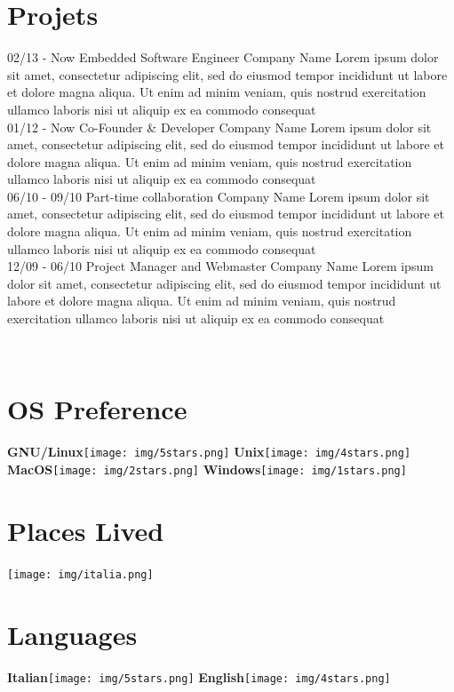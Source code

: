 \documentclass[]{friggeri-cv}
\begin{document}
\section{Projets}
\begin{entrylist}
  \entry
    {02/13 - Now}
    {Embedded Software Engineer}
    {Company Name}
    {Lorem ipsum dolor sit amet, consectetur adipiscing elit, sed do eiusmod tempor incididunt ut labore et dolore magna aliqua. Ut enim ad minim veniam, quis nostrud exercitation ullamco laboris nisi ut aliquip ex ea commodo consequat\\}
  \entry
    {01/12 - Now}
    {Co-Founder \& Developer}
    {Company Name}
    {Lorem ipsum dolor sit amet, consectetur adipiscing elit, sed do eiusmod tempor incididunt ut labore et dolore magna aliqua. Ut enim ad minim veniam, quis nostrud exercitation ullamco laboris nisi ut aliquip ex ea commodo consequat\\}
  \entry
    {06/10 - 09/10}
    {Part-time collaboration}
    {Company Name}
    {Lorem ipsum dolor sit amet, consectetur adipiscing elit, sed do eiusmod tempor incididunt ut labore et dolore magna aliqua. Ut enim ad minim veniam, quis nostrud exercitation ullamco laboris nisi ut aliquip ex ea commodo consequat\\}
  \entry
    {12/09 - 06/10}
    {Project Manager and Webmaster}
    {Company Name}
    {Lorem ipsum dolor sit amet, consectetur adipiscing elit, sed do eiusmod tempor incididunt ut labore et dolore magna aliqua. Ut enim ad minim veniam, quis nostrud exercitation ullamco laboris nisi ut aliquip ex ea commodo consequat\\}
\end{entrylist}
\newpage

\begin{aside}
~
~
~
  \section{OS Preference}
    \textbf{GNU/Linux}\texttt{[image: img/5stars.png]}
    \textbf{Unix}\texttt{[image: img/4stars.png]}
    \textbf{MacOS}\texttt{[image: img/2stars.png]}
    \textbf{Windows}\texttt{[image: img/1stars.png]}
    ~
  \section{Places Lived}
    \texttt{[image: img/italia.png]}
    ~
  \section{Languages}
    \textbf{Italian}\texttt{[image: img/5stars.png]}
    \textbf{English}\texttt{[image: img/4stars.png]}
    ~
\end{aside}
\end{document}
